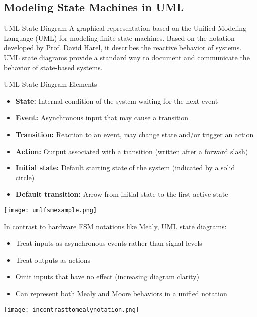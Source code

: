 \raggedcolumns
\columnbreak

\subsection{Modeling State Machines in UML}

\begin{definition}{UML State Diagram}
A graphical representation based on the Unified Modeling Language (UML) for modeling finite state machines. Based on the notation developed by Prof. David Harel, it describes the reactive behavior of systems. UML state diagrams provide a standard way to document and communicate the behavior of state-based systems.
\end{definition}

\begin{concept}{UML State Diagram Elements}
\begin{itemize}
    \item \textbf{State:} Internal condition of the system waiting for the next event
    \item \textbf{Event:} Asynchronous input that may cause a transition
    \item \textbf{Transition:} Reaction to an event, may change state and/or trigger an action
    \item \textbf{Action:} Output associated with a transition (written after a forward slash)
    \item \textbf{Initial state:} Default starting state of the system (indicated by a solid circle)
    \item \textbf{Default transition:} Arrow from initial state to the first active state
\end{itemize}
\texttt{[image: umlfsmexample.png]}

In contrast to hardware FSM notations like Mealy, UML state diagrams:
\begin{itemize}
    \item Treat inputs as asynchronous events rather than signal levels
    \item Treat outputs as actions
    \item Omit inputs that have no effect (increasing diagram clarity)
    \item Can represent both Mealy and Moore behaviors in a unified notation
\end{itemize}
\texttt{[image: incontrasttomealynotation.png]}
\end{concept}

